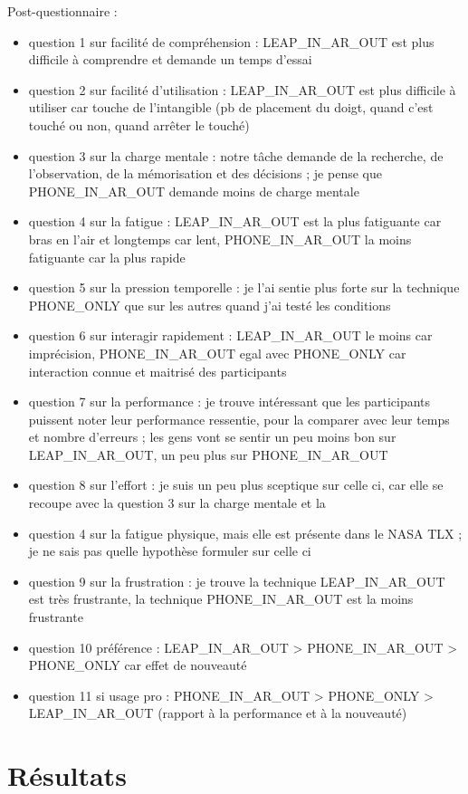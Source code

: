Post-questionnaire :
\begin{itemize}
  \item question 1 sur facilité de compréhension : LEAP_IN_AR_OUT est plus difficile à comprendre et demande un temps d'essai
  \item question 2 sur facilité d'utilisation : LEAP_IN_AR_OUT est plus difficile à utiliser car touche de l'intangible (pb de placement du doigt, quand c'est touché ou non, quand arrêter le touché)
  \item question 3 sur la charge mentale : notre tâche demande de la recherche, de l'observation, de la mémorisation et des décisions ; je pense que PHONE_IN_AR_OUT demande moins de charge mentale
  \item question 4 sur la fatigue : LEAP_IN_AR_OUT est la plus fatiguante car bras en l'air et longtemps car lent, PHONE_IN_AR_OUT la moins fatiguante car la plus rapide
  \item question 5 sur la pression temporelle : je l'ai sentie plus forte sur la technique PHONE_ONLY que sur les autres quand j'ai testé les conditions
  \item question 6 sur interagir rapidement : LEAP_IN_AR_OUT le moins car imprécision, PHONE_IN_AR_OUT egal avec PHONE_ONLY car interaction connue et maitrisé des participants
  \item question 7 sur la performance : je trouve intéressant que les participants puissent noter leur performance ressentie, pour la comparer avec leur temps et nombre d'erreurs ; les gens vont se sentir un peu moins bon sur LEAP_IN_AR_OUT, un peu plus sur PHONE_IN_AR_OUT
  \item question 8 sur l'effort : je suis un peu plus sceptique sur celle ci, car elle se recoupe avec la question 3 sur la charge mentale et la \item question 4 sur la fatigue physique, mais elle est présente dans le NASA TLX ; je ne sais pas quelle hypothèse formuler sur celle ci
  \item question 9 sur la frustration : je trouve la technique LEAP_IN_AR_OUT est très frustrante, la technique PHONE_IN_AR_OUT est la moins frustrante
  \item question 10 préférence : LEAP_IN_AR_OUT > PHONE_IN_AR_OUT > PHONE_ONLY car effet de nouveauté
  \item question 11 si usage pro : PHONE_IN_AR_OUT > PHONE_ONLY > LEAP_IN_AR_OUT (rapport à la performance et à la nouveauté)
\end{itemize}

\section{Résultats}